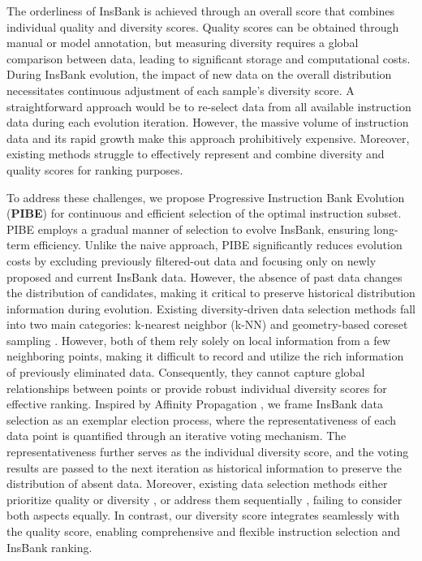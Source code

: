 The orderliness of InsBank is achieved through an overall score that combines individual quality and diversity scores. Quality scores can be obtained through manual or model annotation, but measuring diversity requires a global comparison between data, leading to significant storage and computational costs. During InsBank evolution, the impact of new data on the overall distribution necessitates continuous adjustment of each sample's diversity score. A straightforward approach would be to re-select data from all available instruction data during each evolution iteration. However, the massive volume of instruction data \citep{ds-survey} and its rapid growth \citep{collection-flan-2022, collection-self-instruct, collection-wizardlm} make this approach prohibitively expensive. Moreover, existing methods struggle to effectively represent and combine diversity and quality scores for ranking purposes.

To address these challenges, we propose Progressive Instruction Bank Evolution (\textbf{PIBE}) for continuous and efficient selection of the optimal instruction subset. PIBE employs a gradual manner of selection to evolve InsBank, ensuring long-term efficiency. Unlike the naive approach, PIBE significantly reduces evolution costs by excluding previously filtered-out data and focusing only on newly proposed and current InsBank data. However, the absence of past data changes the distribution of candidates, making it critical to preserve historical distribution information during evolution. Existing diversity-driven data selection methods \citep{ds-deita, ds-self-evolve} fall into two main categories: k-nearest neighbor (k-NN) \citep{indiv_eval_semantic1} and geometry-based coreset sampling \citep{indiv_eval_coreset1}. However, both of them rely solely on local information from a few neighboring points, making it difficult to record and utilize the rich information of previously eliminated data. Consequently, they cannot capture global relationships between points or provide robust individual diversity scores for effective ranking.
Inspired by Affinity Propagation \citep{cluster-ap}, we frame InsBank data selection as an exemplar election process, where the representativeness of each data point is quantified through an iterative voting mechanism. The representativeness further serves as the individual diversity score, and the voting results are passed to the next iteration as historical information to preserve the distribution of absent data. Moreover, existing data selection methods either prioritize quality or diversity \citep{ds-alpagasus}, or address them sequentially \citep{ds-deita}, failing to consider both aspects equally. In contrast, our diversity score integrates seamlessly with the quality score, enabling comprehensive and flexible instruction selection and InsBank ranking.

